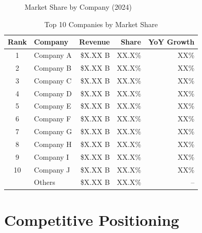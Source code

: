 \documentclass[11pt,letterpaper]{report}
\begin{document}

\begin{figure}[htbp]
\centering
\caption{Market Share by Company (2024)}
\label{fig:market_share}
\end{figure}

\begin{table}[htbp]
\centering
\caption{Top 10 Companies by Market Share}
\begin{tabular}{@{}clrrr@{}}
\toprule
\textbf{Rank} & \textbf{Company} & \textbf{Revenue} & \textbf{Share} & \textbf{YoY Growth} \\
\midrule
1 & Company A & \$X.XX B & XX.X\% & \trendup{} XX\% \\
\rowcolor{tablealt} 2 & Company B & \$X.XX B & XX.X\% & \trendup{} XX\% \\
3 & Company C & \$X.XX B & XX.X\% & \trendflat{} XX\% \\
\rowcolor{tablealt} 4 & Company D & \$X.XX B & XX.X\% & \trendup{} XX\% \\
5 & Company E & \$X.XX B & XX.X\% & \trenddown{} XX\% \\
\rowcolor{tablealt} 6 & Company F & \$X.XX B & XX.X\% & \trendup{} XX\% \\
7 & Company G & \$X.XX B & XX.X\% & \trendup{} XX\% \\
\rowcolor{tablealt} 8 & Company H & \$X.XX B & XX.X\% & \trendflat{} XX\% \\
9 & Company I & \$X.XX B & XX.X\% & \trendup{} XX\% \\
\rowcolor{tablealt} 10 & Company J & \$X.XX B & XX.X\% & \trenddown{} XX\% \\
\midrule
& Others & \$X.XX B & XX.X\% & -- \\
\bottomrule
\end{tabular}
\label{tab:market_share}
\end{table}

\section{Competitive Positioning}
\end{document}
